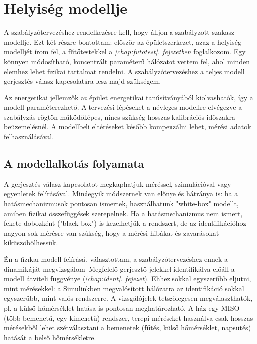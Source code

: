 \chapter{Helyiség modellje}\label{chap:helyiseg}


A szabályzótervezéshez rendelkezésre kell, hogy álljon a szabályzott szakasz modellje. Ezt két részre bontottam: először az épületszerkezet, azaz a helyiség modelljét írom fel, a fűtőtestekkel a \textit{\ref{chap:futotest}. fejezetben} foglalkozom. Egy könnyen módosítható, koncentrált paraméterű hálózatot vettem fel, ahol minden elemhez lehet fizikai tartalmat rendelni. A szabályzótervezéshez a teljes modell gerjesztés-válasz kapcsolatára lesz majd szükségem.

Az energetikai jellemzők az épület energetikai tanúsítványából kiolvashatók, így a modell paraméterezhető. A tervezési lépéseket a névleges modellre elvégezve a szabályzás rögtön működőképes, nincs szükség hosszas kalibrációs időszakra beüzemelésnél. A modellbeli eltéréseket később kompenzálni lehet, mérési adatok felhasználásával.%

\section{A modellalkotás folyamata}
%


A gerjesztés-válasz kapcsolatot megkaphatjuk méréssel, szimulációval vagy egyenletek felírásával. Mindegyik módszernek van előnye és hátránya is:  ha a hatásmechanizmusok pontosan ismertek, használhatunk "white-box" modellt, amiben fizikai összefüggések szerepelnek. Ha a hatásmechanizmus nem ismert, fekete dobozként ("black-box") is kezelhetjük a rendszert, de az identifikációhoz nagyon sok mérésre van szükség, hogy a mérési hibákat és zavarásokat kiküszöbölhessük.%

Én a fizikai modell felírását választottam, a szabályzótervezéshez ennek a dinamikáját megvizsgálom. Megfelelő gerjesztő jelekkel identifikálva előáll a modell átviteli függvénye (\textit{\ref{chap:ident}. fejezet}). Ehhez sokkal egyszerűbb eljutni, mint mérésekkel:
a Simulinkben megvalósított hálózatra az identifikáció sokkal egyszerűbb, mint valós rendszerre. A vizsgálójelek tetszőlegesen megválaszthatók, pl. a külső hőmérséklet hatása is pontosan meghatározható. A ház egy MISO (több bemenetű, egy kimenetű) rendszer, terepi méréseket használva csak hosszas mérésekből lehet szétválasztani a bemenetek (fűtés, külső hőmérséklet, napsütés) hatását a belső hőmérsékletre.

